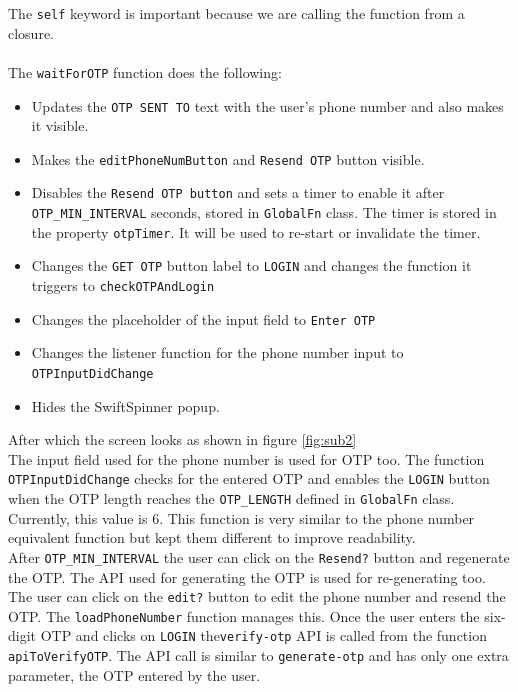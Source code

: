 \documentclass[12pt, conference, a4paper]{article}
\begin{document}
The \texttt{self} keyword is important because we are calling the function from a closure.\\\\
The \texttt{waitForOTP} function does the following:
\begin{itemize}
  \item Updates the \texttt{OTP SENT TO} text with the user’s phone number and also makes it visible. 
  \item Makes the \texttt{editPhoneNumButton} and \texttt{Resend OTP} button visible. 
  \item Disables the \texttt{Resend OTP button} and sets a timer to enable it after \texttt{OTP_MIN_INTERVAL} seconds, stored in \texttt{GlobalFn} class. The timer is stored in the property \texttt{otpTimer}. It will be used to re-start or invalidate the timer. 
  \item Changes the \texttt{GET OTP} button label to \texttt{LOGIN} and changes the function it triggers to \texttt{checkOTPAndLogin} 
  \item Changes the placeholder of the input field to \texttt{Enter OTP}
  \item Changes the listener function for the phone number input to \texttt{OTPInputDidChange}
  \item Hides the SwiftSpinner popup. 
\end{itemize}
After which the screen looks as shown in figure \ref{fig:sub2}\\
The input field used for the phone number is used for OTP too. The function \texttt{OTPInputDidChange} checks for the entered OTP and enables the \texttt{LOGIN} button when the OTP length reaches the \texttt{OTP_LENGTH} defined in \texttt{GlobalFn} class. Currently, this value is 6. This function is very similar to the phone number equivalent function but kept them different to improve readability.\\ 
After \texttt{OTP_MIN_INTERVAL} the user can click on the \texttt{Resend?} button and regenerate the OTP. The API used for generating the OTP is used for re-generating too. 
The user can click on the \texttt{edit?} button to edit the phone number and resend the OTP. The \texttt{loadPhoneNumber} function manages this. 
Once the user enters the six-digit OTP and clicks on \texttt{LOGIN} the\texttt{verify-otp} API is called from the function \texttt{apiToVerifyOTP}. The API call is similar to \texttt{generate-otp} and has only one extra parameter, the OTP entered by the user. 
\end{document}
